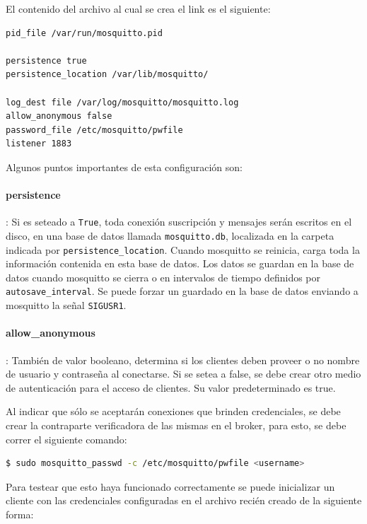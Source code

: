 El contenido del archivo al cual se crea el link es el siguiente:
\begin{lstlisting}[language=bash]
pid_file /var/run/mosquitto.pid

persistence true
persistence_location /var/lib/mosquitto/

log_dest file /var/log/mosquitto/mosquitto.log
allow_anonymous false
password_file /etc/mosquitto/pwfile
listener 1883
\end{lstlisting}

Algunos puntos importantes de esta configuración son:


\paragraph{persistence}: 
Si es seteado a \lstinline[columns=fixed]{True}, toda conexión suscripción y mensajes serán escritos en el disco, en una base de datos llamada \lstinline[columns=fixed]{mosquitto.db}, localizada en la carpeta indicada por \lstinline[columns=fixed]{persistence_location}. Cuando mosquitto se reinicia, carga toda la información contenida en esta base de datos. Los datos se guardan en la base de datos cuando mosquitto se cierra o en intervalos de tiempo definidos por \lstinline[columns=fixed]{autosave_interval}. Se puede forzar un guardado en la base de datos enviando a mosquitto la señal \lstinline[columns=fixed]{SIGUSR1}.

\paragraph{allow\_anonymous}:
También de valor booleano, determina si los clientes deben proveer o no nombre de usuario y contraseña al conectarse. Si se setea a false, se debe crear otro medio de autenticación para el acceso de clientes. Su valor predeterminado es true.

Al indicar que sólo se aceptarán conexiones que brinden credenciales, se debe crear la contraparte verificadora de las mismas en el broker, para esto, se debe correr el siguiente comando:

\begin{lstlisting}[language=bash]
  $ sudo mosquitto_passwd -c /etc/mosquitto/pwfile <username>
\end{lstlisting}

Para testear que esto haya funcionado correctamente se puede inicializar un cliente con las credenciales configuradas en el archivo recién creado de la siguiente forma: 


